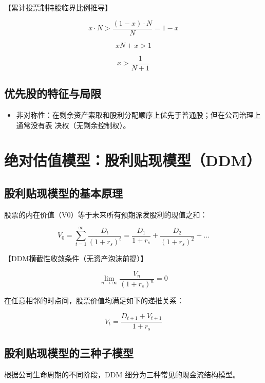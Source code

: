 \documentclass[lang=cn,10pt,color=blue]{elegantbook}
\begin{document}
【累计投票制持股临界比例推导】 

$$
x \cdot N > \frac {(1 - x) \cdot N}{N} = 1 - x
$$

$$
x N + x > 1
$$

$$
x > \boxed {\frac {1}{N + 1}}
$$

\subsection{优先股的特征与局限}

\begin{itemize}
  \item 非对称性：在剩余资产索取和股利分配顺序上优先于普通股；但在公司治理上通常没有表 决权（无剩余控制权）。
\end{itemize}

\section{绝对估值模型：股利贴现模型（DDM）}

\subsection{股利贴现模型的基本原理}

股票的内在价值（V0）等于未来所有预期派发股利的现值之和： 

$$
\boxed {V _ {0} = \sum_ {t = 1} ^ {\infty} \frac {D _ {t}}{(1 + r _ {s}) ^ {t}}} = \frac {D _ {1}}{1 + r _ {s}} + \frac {D _ {2}}{(1 + r _ {s}) ^ {2}} + \dots
$$

【DDM横截性收敛条件（无资产泡沫前提）】 

$$
\lim _ {n \to \infty} \frac {V _ {n}}{(1 + r _ {s}) ^ {n}} = 0
$$

在任意相邻的时点间，股票价值均满足如下的递推关系： 

$$
V _ {t} = \frac {D _ {t + 1} + V _ {t + 1}}{1 + r _ {s}}
$$

\subsection{股利贴现模型的三种子模型}

根据公司生命周期的不同阶段，DDM 细分为三种常见的现金流结构模型。 
\end{document}
